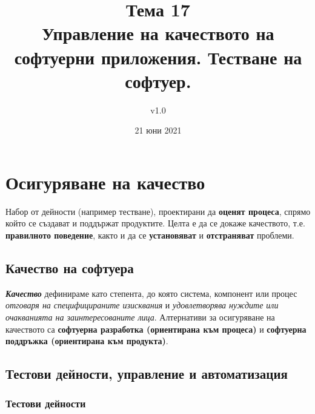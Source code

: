 \documentclass[fleqn,12pt]{article}
\title{Тема 17 \\Управление на качеството на софтуерни приложения. Тестване на софтуер.}
\author{v1.0}
\date{21 юни 2021}
\begin{document}
\maketitle

\tableofcontents
\pagebreak

\section{Осигуряване на качество}
Набор от дейности (например тестване), проектирани да \textbf{оценят процеса}, спрямо който се създават и поддържат продуктите.
Целта е да се докаже качеството, т.е. \textbf{правилното поведение}, както и да се \textbf{установяват} и \textbf{отстраняват} проблеми.

\subsection{Качество на софтуера}

\textbf{\textit{Качество}} дефинираме като степента, до която система, компонент или процес \textit{отговаря на специфицираните изисквания} и \textit{удовлетворява нуждите или очакванията на заинтересованите лица}.
\bigbreak
Алтернативи за осигуряване на качеството са \textbf{софтуерна разработка (ориентирана към процеса)} и \textbf{софтуерна поддръжка (ориентирана към продукта)}.

\subsection{Тестови дейности, управление и автоматизация}
\subsubsection{Тестови дейности}
\end{document}
